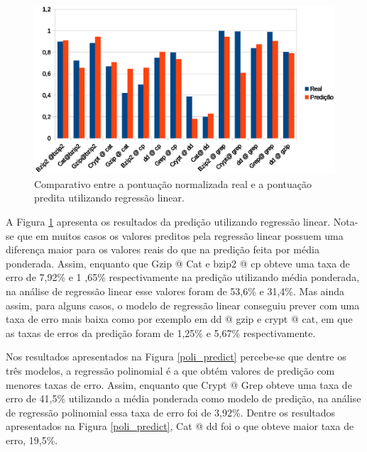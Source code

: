 \documentclass[[10pt,journal]{IEEEtran}
\begin{document}
\begin{figure}[!htb]
\centering
\includegraphics [keepaspectratio=true,scale=0.5]{graficos/linear.eps}
\caption{Comparativo entre a pontuação normalizada real e a pontuação predita utilizando regressão linear.}
\label{linear_predict}
\end{figure}   

A Figura \ref{linear_predict} apresenta os resultados da predição utilizando regressão linear. Nota-se que em muitos casos os valores preditos pela regressão linear possuem uma diferença maior para os valores reais do que na predição feita por média ponderada. Assim, enquanto que Gzip @ Cat e bzip2 @ cp obteve uma taxa de erro de 7,92\% e 1 ,65\% respectivamente na predição utilizando média ponderada, na análise de regressão linear esse valores foram de 53,6\% e 31,4\%. Mas ainda assim, para alguns casos, o modelo de regressão linear conseguiu prever com uma taxa de erro mais baixa como por exemplo em dd @ gzip e crypt @ cat, em que as taxas de erros da predição foram de 1,25\% e 5,67\% respectivamente.

Nos resultados apresentados na Figura \ref{poli_predict} percebe-se que dentre os três modelos, a regressão polinomial é a que obtém valores de predição com menores taxas de erro. Assim, enquanto que Crypt @ Grep obteve uma taxa de erro de 41,5\% utilizando a média ponderada como modelo de predição, na análise de regressão polinomial essa taxa de erro foi de 3,92\%. Dentre os resultados apresentados na Figura \ref{poli_predict}, Cat @ dd foi o que obteve maior taxa de erro, 19,5\%. 
\end{document}
